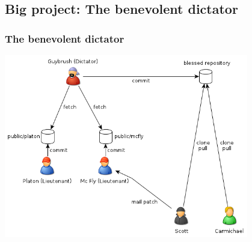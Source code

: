 \documentclass{beamer}
\begin{document}
        \subsection{Big project: The benevolent dictator}
    \begin{frame}
        \frametitle{The benevolent dictator}
        \begin{center}
            \includegraphics[width=0.8\textwidth]{./figures/dictator.png}
        \end{center}

    \end{frame}
\end{document}

